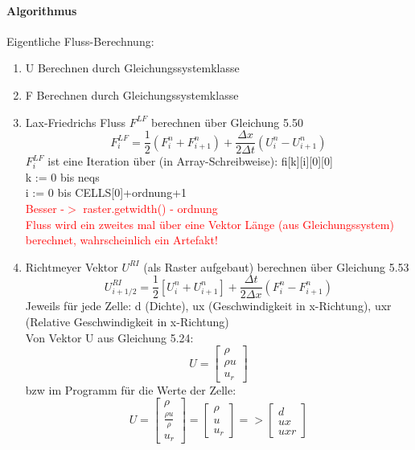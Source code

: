 \documentclass[12pt]{article}
\begin{document}
\paragraph{Algorithmus}
Eigentliche Fluss-Berechnung:\\
\begin{enumerate}
	\item U Berechnen durch Gleichungssystemklasse
	\item F Berechnen durch Gleichungssystemklasse
	\item Lax-Friedrichs Fluss $F^{LF}$ berechnen über Gleichung 5.50\\
	\begin{equation}
	F^{LF}_i = \frac{1}{2}\left(F_i^n+F_{i+1}^n \right) + \frac{\Delta x}{2
		\Delta t}\left(U_i^n - U_{i+1}^n \right)\label{eq:fluss_LF}
	\end{equation}
	$F^{LF}_i$ ist eine Iteration über (in Array-Schreibweise): fi[k][i][0][0]\\
	k := 0 bis neqs\\
	i := 0 bis CELLS[0]+ordnung+1\\
	\textcolor{red}{Besser -$>$ raster.getwidth() - ordnung\\
	Fluss wird ein zweites mal über eine Vektor Länge (aus Gleichungssystem) berechnet, wahrscheinlich ein Artefakt!}
	\item Richtmeyer Vektor $U^{RI}$ (als Raster aufgebaut) berechnen über Gleichung 5.53\\
	\begin{equation}
	U^{RI}_{i+1/2} = \frac{1}{2}\left[U_i^n + U_{i+1}^n\right] + \frac{\Delta t}{2
		\Delta x}\left(F_{i}^n - F_{i+1}^n \right) \label{eq:fluss_RI}
	\end{equation}
	Jeweils für jede Zelle: d (Dichte), ux (Geschwindigkeit in x-Richtung), uxr (Relative Geschwindigkeit in x-Richtung)\\
	Von Vektor U aus Gleichung 5.24:
	\[
	U =  \left[\begin{array}{c}\rho \\ \rho u \\ u_r\end{array}\right]
	\]
	bzw im Programm für die Werte der Zelle:
	\[
	U =  \left[\begin{array}{c}\rho \\ \frac{\rho u}{\rho} \\ u_r\end{array}\right]
	=  \left[\begin{array}{c}\rho \\ u \\ u_r\end{array}\right]
	=>  \left[\begin{array}{c}d \\ ux \\ uxr\end{array}\right]
	\]
	

\end{enumerate}
\end{document}
